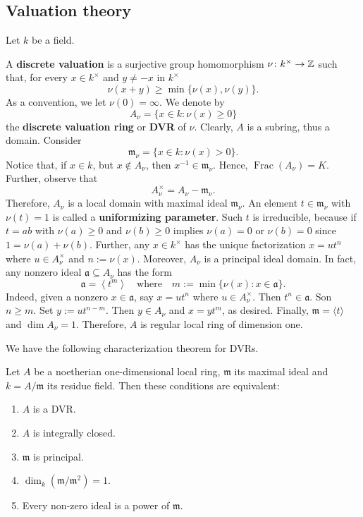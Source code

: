\subsection{Valuation theory}
Let $k$ be a field. 
\begin{definition}\label{def:discrete-valuation}
	A \textbf{discrete valuation} is a surjective group homomorphism $\nu\colon k^{\times} \to {\mathbb Z}$ such that, for every $x\in k^{\times}$ and $y \neq -x$ in $k^{\times}$
	\[
		\nu(x + y) \geq \min\{\nu(x), \nu(y)\}.
	\]
	As a convention, we let $\nu(0) = \infty$. We denote by
	\[
	A_{\nu} = \{x \in k\colon \nu(x)\geq 0\}
	\]
	the \textbf{discrete valuation ring} or \textbf{DVR} of $\nu$. Clearly, $A$ is a subring, thus a domain. Consider
	\[
		\mathfrak{m}_{\nu} = \{x\in k\colon \nu(x) > 0\}. 
	\]
	Notice that, if $x\in k$, but $x\notin A_{\nu}$, then $x^{-1}\in \mathfrak{m}_{\nu}$. Hence, $\operatorname{Frac}(A_{\nu}) = K$. Further, observe that
	\[
	A_{\nu}^{\times} = A_{\nu} - \mathfrak{m}_{\nu}.
	\]
	Therefore, $A_{\nu}$ is a local domain with maximal ideal $\mathfrak{m}_{\nu}$. An element $t \in \mathfrak{m}_{\nu}$ with $\nu(t) = 1$ is called a \textbf{uniformizing parameter}. Such $t$ is irreducible, because if $t = ab$ with $\nu(a)\geq 0$ and $\nu(b)\geq 0$ implies $\nu(a) = 0$ or $\nu(b) = 0$ since $1 = \nu(a) + \nu(b)$. Further, any $x \in k^{\times}$ has the unique factorization $x = u t^{n}$ where $u \in A_{\nu}^{\times}$ and $n := \nu(x)$. Moreover, $A_{\nu}$ is a principal ideal domain. In fact, any nonzero ideal $\mathfrak{a} \subseteq A_{\nu}$ has the form
	\[
		\mathfrak{a} = \left\langle t^{m}\right\rangle \quad\text{where}\quad m:=\min\{\nu(x)\colon x\in \mathfrak{a}\}.
	\]
	Indeed, given a nonzero $x \in \mathfrak{a}$, say $x = ut^{n}$ where $u \in A_{\nu}^{\times}$. Then $t^{n}\in \mathfrak{a}$. Son $n \geq m$. Set $y := ut^{n-m}$. Then $y\in A_\nu$ and $x = yt^{m}$, as desired. Finally, $\mathfrak{m} = \langle t\rangle$ and $\dim A_{\nu} = 1$. Therefore, $A$ is regular local ring of dimension one.
\end{definition}
We have the following characterization theorem for DVRs.
\begin{theorem}\label{thm:characterization-of-DVRs}
	Let $A$ be a noetherian one-dimensional local ring, $\mathfrak{m}$ its maximal ideal and $k = A/\mathfrak{m}$ its residue field. Then these conditions are equivalent:
	\begin{enumerate}[label = (\roman*)]
		\item $A$ is a DVR.
		\item $A$ is integrally closed.
		\item $\mathfrak{m}$ is principal.
		\item $\dim_{k}(\mathfrak{m}/\mathfrak{m}^{2}) = 1$.
		\item Every non-zero ideal is a power of $\mathfrak{m}$.
	\end{enumerate}
\end{theorem}
